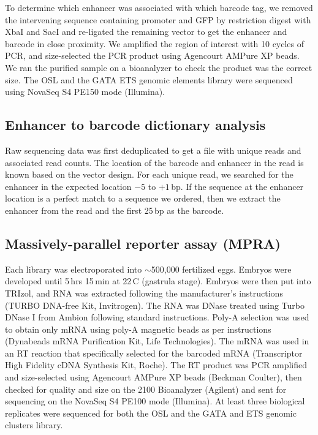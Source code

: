 To determine which enhancer was associated with which barcode tag, we removed the intervening sequence containing promoter and GFP by restriction digest with XbaI and SacI and re-ligated the remaining vector to get the enhancer and barcode in close proximity. We amplified the region of interest with 10 cycles of PCR, and size-selected the PCR product using Agencourt AMPure XP beads. We ran the purified sample on a bioanalyzer to check the product was the correct size. The OSL and the GATA ETS genomic elements library were sequenced using NovaSeq S4 PE150 mode (Illumina).

\subsection{Enhancer to barcode dictionary analysis}

Raw sequencing data was first deduplicated to get a file with unique reads and associated read counts. The location of the barcode and enhancer in the read is known based on the vector design. For each unique read, we searched for the enhancer in the expected location $-5$ to $+1$\,bp. If the sequence at the enhancer location is a perfect match to a sequence we ordered, then we extract the enhancer from the read and the first 25\,bp as the barcode.

\subsection{Massively-parallel reporter assay (MPRA)}

Each library was electroporated into $\sim$500,000 fertilized eggs. Embryos were developed until 5\,hrs 15\,min at 22\,\textdegree C (gastrula stage). Embryos were then put into TRIzol, and RNA was extracted following the manufacturer’s instructions (TURBO DNA-free Kit, Invitrogen). The RNA was DNase treated using Turbo DNase I from Ambion following standard instructions. Poly-A selection was used to obtain only mRNA using poly-A magnetic beads as per instructions (Dynabeads mRNA Purification Kit, Life Technologies). The mRNA was used in an RT reaction that specifically selected for the barcoded mRNA (Transcriptor High Fidelity cDNA Synthesis Kit, Roche). The RT product was PCR amplified and size-selected using Agencourt AMPure XP beads (Beckman Coulter), then checked for quality and size on the 2100 Bioanalyzer (Agilent) and sent for sequencing on the NovaSeq S4 PE100 mode (Illumina). At least three biological replicates were sequenced for both the OSL and the GATA and ETS genomic clusters library.

